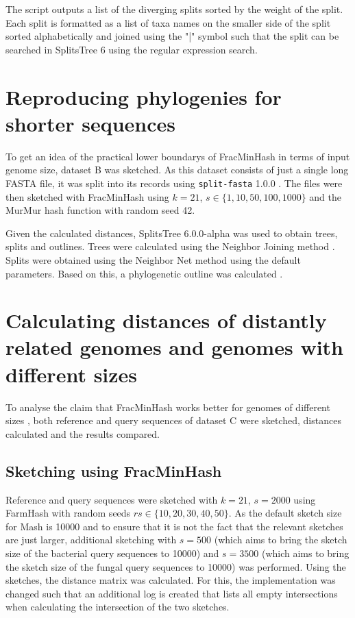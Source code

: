 The script outputs a list of the diverging splits sorted by the weight of the
split. Each split is formatted as a list of taxa names on the smaller side of
the split sorted alphabetically and joined using the "|" symbol such that the
split can be searched in SplitsTree 6 using the regular expression search.



\section{Reproducing phylogenies for shorter sequences}
To get an idea of the practical lower boundarys of FracMinHash in terms of input
genome size, dataset B was sketched. As this dataset consists of just a single
long FASTA file, it was split into its records using \texttt{split-fasta} 1.0.0
. The files were then sketched with FracMinHash using
$k=21$, $s \in \{1, 10, 50, 100, 1000\}$ and the 
MurMur hash function with random seed 42.

Given the calculated distances, SplitsTree 6.0.0-alpha
\cite{husonApplicationPhylogeneticNetworks2006} was used to obtain trees, splits
and outlines. Trees were calculated using the Neighbor Joining method
\cite{saitouNeighborjoiningMethodNew1987}. Splits were obtained using the
Neighbor Net method
\cite{bryantNeighborNetAgglomerativeMethod2004,bryantNeighborNetImprovedAlgorithms2023}
using the default parameters. Based on this, a phylogenetic outline was
calculated \cite{bagciMicrobialPhylogeneticContext2021}.


\section{Calculating distances of distantly related genomes and genomes with different sizes}
To analyse the claim that FracMinHash works better for genomes of different
sizes , both reference and query
sequences of dataset C were sketched, distances calculated and the results
compared. 

\subsection*{Sketching using FracMinHash}
\label{sec:intersectionlog}
Reference and query sequences were sketched with $k=21$, $s=2000$ using FarmHash
with random seeds $rs \in \{10, 20, 30, 40, 50\}$. As the default sketch size
for Mash is 10000 \cite{ondovMashFastGenome2016} and to ensure that it is not
the fact that the relevant sketches are just larger, additional sketching with
$s=500$ (which aims to bring the sketch size of the bacterial query sequences to
10000) and $s=3500$ (which aims to bring the sketch size of the fungal query
sequences to 10000) was performed. Using the sketches, the distance matrix was
calculated. For this, the implementation was changed such that an additional log
is created that lists all empty intersections when calculating the intersection
of the two sketches.

